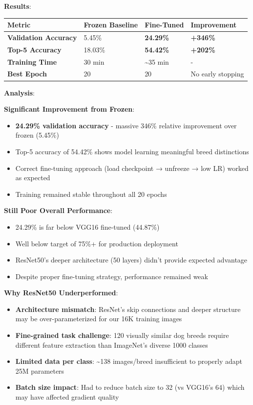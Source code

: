 \documentclass[
  letterpaper,
  DIV=11,
  numbers=noendperiod]{scrartcl}
\providecommand{\tightlist}{%
  \setlength{\itemsep}{0pt}\setlength{\parskip}{0pt}}
\begin{document}
\textbf{Results}:

\begin{longtable}[]{@{}llll@{}}
\toprule\noalign{}
Metric & Frozen Baseline & Fine-Tuned & Improvement \\
\midrule\noalign{}
\endhead
\bottomrule\noalign{}
\endlastfoot
\textbf{Validation Accuracy} & 5.45\% & \textbf{24.29\%} &
\textbf{+346\%} \\
\textbf{Top-5 Accuracy} & 18.03\% & \textbf{54.42\%} &
\textbf{+202\%} \\
\textbf{Training Time} & 30 min & \textasciitilde35 min & - \\
\textbf{Best Epoch} & 20 & 20 & No early stopping \\
\end{longtable}

\textbf{Analysis}:

\textbf{Significant Improvement from Frozen}:

\begin{itemize}
\tightlist
\item
  \textbf{24.29\% validation accuracy} - massive 346\% relative
  improvement over frozen (5.45\%)
\item
  Top-5 accuracy of 54.42\% shows model learning meaningful breed
  distinctions
\item
  Correct fine-tuning approach (load checkpoint → unfreeze → low LR)
  worked as expected
\item
  Training remained stable throughout all 20 epochs
\end{itemize}

\textbf{Still Poor Overall Performance}:

\begin{itemize}
\tightlist
\item
  24.29\% is far below VGG16 fine-tuned (44.87\%)
\item
  Well below target of 75\%+ for production deployment
\item
  ResNet50's deeper architecture (50 layers) didn't provide expected
  advantage
\item
  Despite proper fine-tuning strategy, performance remained weak
\end{itemize}

\textbf{Why ResNet50 Underperformed}:

\begin{itemize}
\tightlist
\item
  \textbf{Architecture mismatch}: ResNet's skip connections and deeper
  structure may be over-parameterized for our 16K training images
\item
  \textbf{Fine-grained task challenge}: 120 visually similar dog breeds
  require different feature extraction than ImageNet's diverse 1000
  classes
\item
  \textbf{Limited data per class}: \textasciitilde138 images/breed
  insufficient to properly adapt 25M parameters
\item
  \textbf{Batch size impact}: Had to reduce batch size to 32 (vs VGG16's
  64) which may have affected gradient quality
\end{itemize}
\end{document}
